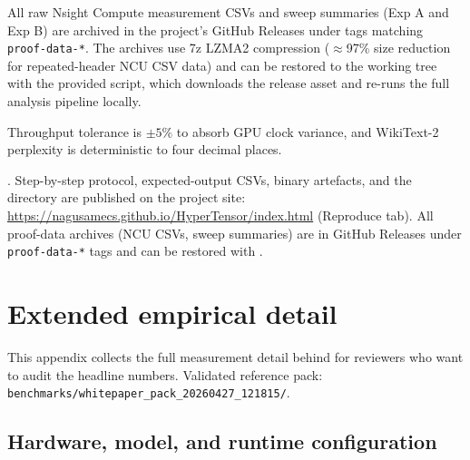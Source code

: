 \documentclass[11pt]{article}
\begin{document}
All raw Nsight Compute measurement CSVs and sweep summaries (Exp A and Exp B)
are archived in the project's GitHub Releases under tags matching
\texttt{proof-data-*}. The archives use 7z LZMA2 compression ($\approx$97\%
size reduction for repeated-header NCU CSV data) and can be restored to the
working tree with the provided 
script, which downloads the release asset and re-runs the full analysis
pipeline locally.

Throughput tolerance is $\pm 5\%$ to absorb GPU clock variance, and
WikiText-2 perplexity is deterministic to four decimal places.

\smallskip\noindentReproduction.
Step-by-step protocol, expected-output CSVs, binary artefacts, and
the  directory are published on the project site:
\url{https://nagusamecs.github.io/HyperTensor/index.html} (Reproduce tab).
All proof-data archives (NCU CSVs, sweep summaries) are in GitHub Releases
under \texttt{proof-data-*} tags and can be restored with
.

\appendix

\section{Extended empirical detail}
\label{app:extended}

This appendix collects the full measurement detail behind
 for reviewers who want to
audit the headline numbers. Validated reference pack:
\texttt{benchmarks/whitepaper\_pack\_20260427\_121815/}.

\subsection{Hardware, model, and runtime configuration}
\end{document}

